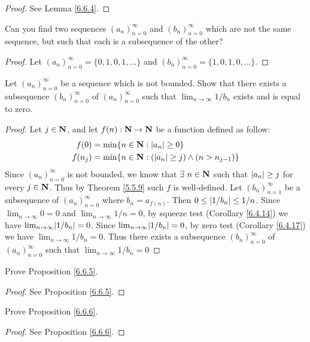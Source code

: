 \begin{proof}
    See Lemma \ref{6.6.4}.
\end{proof}

\begin{exercise}\label{ex 6.6.2}
    Can you find two sequences \((a_n)_{n = 0}^\infty\) and \((b_n)_{n = 0}^\infty\) which are not the same sequence, but such that each is a subsequence of the other?
\end{exercise}

\begin{proof}
    Let \((a_n)_{n = 0}^\infty = \{0, 1, 0, 1, \dots\}\) and \((b_n)_{n = 0}^\infty = \{1, 0, 1, 0, \dots\}\).
\end{proof}

\begin{exercise}\label{ex 6.6.3}
    Let \((a_n)_{n = 0}^\infty\) be a sequence which is not bounded.
    Show that there exists a subsequence \((b_n)_{n = 0}^\infty\) of \((a_n)_{n = 0}^\infty\) such that \(\lim_{n \to \infty} 1 / b_n\) exists and is equal to zero.
\end{exercise}

\begin{proof}
    Let \(j \in \mathbf{N}\), and let \(f(n) : \mathbf{N} \to \mathbf{N}\) be a function defined as follow:
    \begin{align*}
        f(0)   & = \min\{n \in \mathbf{N} : \left\lvert a_n\right\rvert \geq 0\}                         \\
        f(n_j) & = \min\{n \in \mathbf{N} : (\left\lvert a_n\right\rvert \geq j) \land (n > n_{j - 1})\}
    \end{align*}
    Since \((a_n)_{n = 0}^\infty\) is not bounded, we know that \(\exists\ n \in \mathbf{N}\) such that \(\left\lvert a_n\right\rvert \geq j\) for every \(j \in \mathbf{N}\).
    Thus by Theorem \ref{5.5.9} such \(f\) is well-defined.
    Let \((b_n)_{n = 1}^\infty\) be a subsequence of \((a_n)_{n = 0}^\infty\) where \(b_n = a_{f(n)}\).
    Then \(0 \leq \left\lvert1 / b_n\right\rvert \leq 1 / n\).
    Since \(\lim_{n \to \infty} 0 = 0\) and \(\lim_{n \to \infty} 1 / n = 0\), by squeeze test (Corollary \ref{6.4.14}) we have \(\lim_{n \to \infty} \abs{1 / b_n} = 0\).
    Since \(\lim_{n \to \infty} \abs{1 / b_n} = 0\), by zero test (Corollary \ref{6.4.17}) we have \(\lim_{n \to \infty} 1 / b_n = 0\).
    Thus there exists a subsequence \((b_n)_{n = 0}^\infty\) of \((a_n)_{n = 0}^\infty\) such that \(\lim_{n \to \infty} 1 / b_n = 0\)
\end{proof}

\begin{exercise}\label{ex 6.6.4}
    Prove Proposition \ref{6.6.5}.
\end{exercise}

\begin{proof}
    See Proposition \ref{6.6.5}.
\end{proof}

\begin{exercise}\label{ex 6.6.5}
    Prove Proposition \ref{6.6.6}.
\end{exercise}

\begin{proof}
    See Proposition \ref{6.6.6}.
\end{proof}